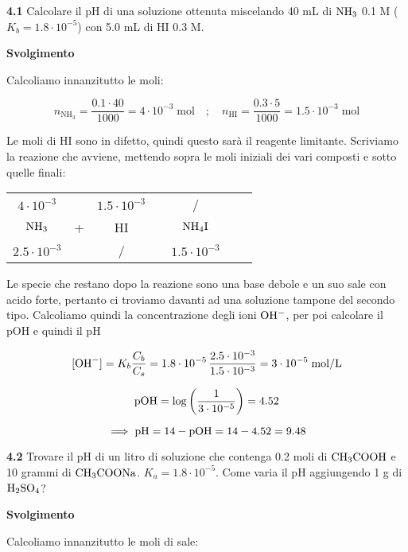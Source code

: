 \textbf{4.1} Calcolare il pH di una soluzione ottenuta miscelando 40 mL di $\rm NH_3$ 0.1 M ($K_b = 1.8 \cdot 10^{-5}$) con 5.0 mL di HI 0.3 M.

\vspace{0.2cm}\large\textbf{Svolgimento}\normalsize

\vspace{0.2cm}Calcoliamo innanzitutto le moli:

$$n_{\text{NH}_3}=\frac{0.1 \cdot 40}{1000}
=4 \cdot 10^{-3} \; \text{mol}
\quad ; \quad
n_{\text{HI}}=\frac{0.3 \cdot 5}{1000}
=1.5 \cdot 10^{-3} \;\text{mol}$$

Le moli di HI sono in difetto, quindi questo sarà il reagente limitante. Scriviamo la reazione che avviene, mettendo sopra le moli iniziali dei vari composti e sotto quelle finali:

\begin{center}
    \begin{tabular}{ccccccc}
        $4 \cdot 10^{-3}$ & & $1.5 \cdot 10^{-3}$ & & /\\
        $\rm NH_3$ & + & HI & \ce{->} & $\rm NH_4I$ \\
        $2.5 \cdot 10^{-3}$ & & / & & $1.5 \cdot 10^{-3}$\\
    \end{tabular}
\end{center}

Le specie che restano dopo la reazione sono una base debole e un suo sale con acido forte, pertanto ci troviamo davanti ad una soluzione tampone del secondo tipo. Calcoliamo quindi la concentrazione degli ioni $\rm OH^-$, per poi calcolare il pOH e quindi il pH

$$[\text{OH}^-]=K_b\frac{C_b}{C_s}
=1.8 \cdot 10^{-5}\,\frac{2.5 \cdot 10^{-3}}{1.5 \cdot 10^{-3}}
= 3 \cdot 10^{-5} \; \rm mol/L$$

$$\rm pOH=\log\left(\frac{1}{3 \cdot 10^{-5}}\right)=4.52$$

$$\implies \rm pH=14-pOH=14-4.52=9.48$$

\vspace{0.2cm}\textbf{4.2} Trovare il pH di un litro di soluzione che contenga 0.2 moli di $\rm CH_3COOH$ e 10 grammi di $\rm CH_3COONa$. $K_a = 1.8 \cdot 10^{-5}$. Come varia il pH aggiungendo 1 g di $\rm H_2SO_4$?

\vspace{0.2cm}\large\textbf{Svolgimento}\normalsize

\vspace{0.2cm}Calcoliamo innanzitutto le moli di sale:

